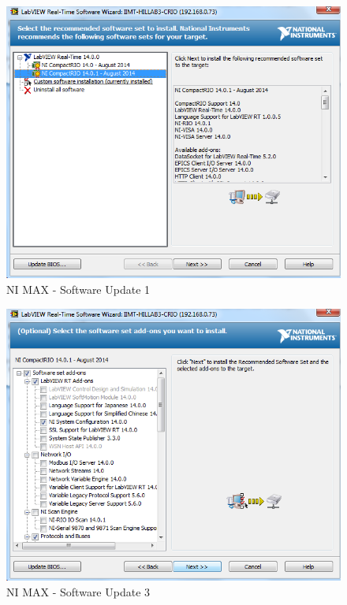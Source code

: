\documentclass[a4paper,twoside,english]{report}
\begin{document}
\begin{figure}[!h]
\centering \includegraphics[scale=0.45]{Screenshots/Screenshot_2015-01-16_14-12-51.png}
\caption{NI MAX - Software Update 1}

\label{fig: NI MAX - Software Update 2} 
\end{figure}

\begin{figure}[!h]
\centering \includegraphics[scale=0.45]{Screenshots/Screenshot_2015-01-16_14-13-03.png}
\caption{NI MAX - Software Update 3}

\label{fig: NI MAX - Software Update 1-3} 
\end{figure}
\end{document}
